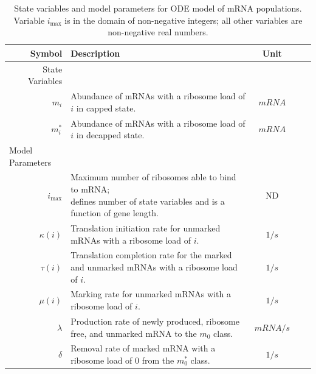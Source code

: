 \documentclass[review]{elsarticle}
\newcommand{\imax}{\ensuremath{i_{\max}}\xspace}
\begin{document}
\begin{table}
\centering
\begin{tabular}{|rp{4in}|c|c|c|}\hline
\textbf{Symbol}&\textbf{Description}&\textbf{Unit} \\\hline
State Variables & &  \\ \hline
$m_i$ & Abundance of mRNAs with a ribosome load of $i$ in capped state. & $mRNA$ \\
$m_i^*$ & Abundance of mRNAs with a ribosome load of $i$ in decapped state. & $mRNA$ \\ \hline
\multicolumn{1}{l}{Model Parameters} \\ \hline
  \imax & \shortstack{Maximum number of ribosomes able to bind to mRNA;\\
           defines number of state variables and is a function of gene length.} & ND \\
$\kappa(i)$ & Translation initiation rate for unmarked mRNAs with a ribosome load of $i$. & $1/s$\\
$\tau(i)$ & Translation completion rate for the marked and unmarked mRNAs with a ribosome load of $i$. & $1/s$\\
$\mu(i)$ & Marking rate for unmarked mRNAs with a ribosome load of $i$. & $1/s$\\
$\lambda$ & Production rate of newly produced, ribosome free, and unmarked mRNA to the $m_0$ class. & $mRNA/s$\\
$\delta$ & Removal rate of marked mRNA with a ribosome load of 0 from the $m_0^*$ class. & $1/s$\\ \hline 
\end{tabular}
\caption{State variables and model parameters for ODE model of mRNA populations.
Variable \imax is in the domain of non-negative integers; all other variables are non-negative real numbers.}
\label{tab:params}
\end{table}
\end{document}
